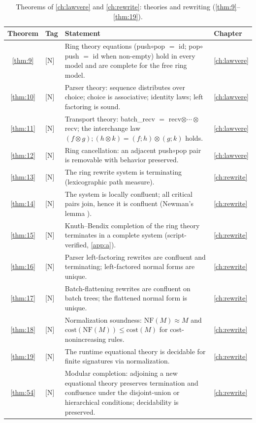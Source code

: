 \begin{table}[!htbp]
\centering
\caption{Theorems of \autoref{ch:lawvere} and \autoref{ch:rewrite}: theories and rewriting (\autoref{thm:9}--\autoref{thm:19}).}
\label{tab:thm-lawvere-rewrite}
\small
\begin{tabular}{@{}clp{7.2cm}l@{}}
\toprule
Theorem & Tag & Statement & Chapter\\
\midrule
\ref{thm:9} & [N] & Ring theory equations (push$\circ$pop $=$ id; pop$\circ$push $=$ id when non-empty) hold in every model and are complete for the free ring model. & \autoref{ch:lawvere}\\
\ref{thm:10} & [N] & Parser theory: sequence distributes over choice; choice is associative; identity laws; left factoring is sound. & \autoref{ch:lawvere}\\
\ref{thm:11} & [N] & Transport theory: batch\_recv $=$ recv$\otimes\cdots\otimes$recv; the interchange law $(f\otimes g);(h\otimes k) = (f;h)\otimes (g;k)$ holds. & \autoref{ch:lawvere}\\
\ref{thm:12} & [N] & Ring cancellation: an adjacent push$\circ$pop pair is removable with behavior preserved. & \autoref{ch:lawvere}\\
\ref{thm:13} & [N] & The ring rewrite system is terminating (lexicographic path measure). & \autoref{ch:rewrite}\\
\ref{thm:14} & [N] & The system is locally confluent; all critical pairs join, hence it is confluent (Newman's lemma \cite{newman}). & \autoref{ch:rewrite}\\
\ref{thm:15} & [N] & Knuth--Bendix completion of the ring theory terminates in a complete system (script-verified, \autoref{app:a}). & \autoref{ch:rewrite}\\
\ref{thm:16} & [N] & Parser left-factoring rewrites are confluent and terminating; left-factored normal forms are unique. & \autoref{ch:rewrite}\\
\ref{thm:17} & [N] & Batch-flattening rewrites are confluent on batch trees; the flattened normal form is unique. & \autoref{ch:rewrite}\\
\ref{thm:18} & [N] & Normalization soundness: $\mathrm{NF} (M) \approx M$ and $\mathrm{cost} (\mathrm{NF} (M)) \le \mathrm{cost} (M)$ for cost-nonincreasing rules. & \autoref{ch:rewrite}\\
\ref{thm:19} & [N] & The runtime equational theory is decidable for finite signatures via normalization. & \autoref{ch:rewrite}\\
\ref{thm:54} & [N] & Modular completion: adjoining a new equational theory preserves termination and confluence under the disjoint-union or hierarchical conditions; decidability is preserved. & \autoref{ch:rewrite}\\
\bottomrule
\end{tabular}
\end{table}

